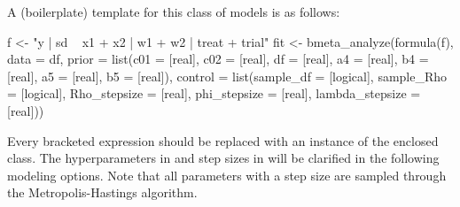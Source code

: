 A (boilerplate) template for this class of models is as follows:
\begin{example}
  f <- "y | sd ~ x1 + x2 | w1 + w2 | treat + trial"
  fit <- bmeta_analyze(formula(f), data = df,
            prior = list(c01 = [real], c02 = [real], df = [real],
              a4 = [real], b4 = [real], a5 = [real], b5 = [real]),
            control = list(sample_df = [logical], sample_Rho = [logical],
              Rho_stepsize = [real], phi_stepsize = [real], lambda_stepsize = [real]))
\end{example}
Every bracketed expression should be replaced with an instance of the enclosed class. The hyperparameters in  and step sizes in  will be clarified in the following modeling options. Note that all parameters with a step size are sampled through the Metropolis-Hastings algorithm.

